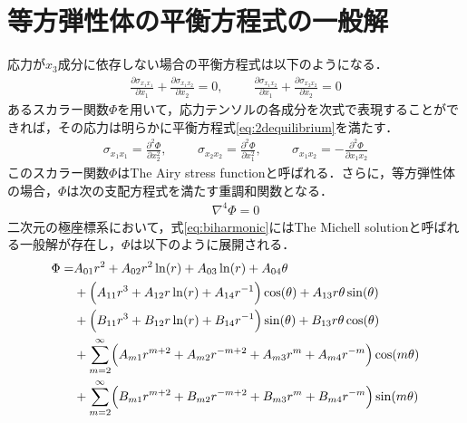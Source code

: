 \section{等方弾性体の平衡方程式の一般解}

応力が$x_{3}$成分に依存しない場合の平衡方程式は以下のようになる．
\begin{align}
	\frac{\partial \sigma_{x_{1}x_{1}}}{\partial x_{1}}+\frac{\partial \sigma_{x_{1}x_{2}}}{\partial x_{2}}=0,\hspace{1cm}
	\frac{\partial \sigma_{x_{1}x_{2}}}{\partial x_{1}}+\frac{\partial \sigma_{x_{2}x_{2}}}{\partial x_{2}}=0
	\label{eq:2dequilibrium}
\end{align}
あるスカラー関数$\Phi$を用いて，応力テンソルの各成分を次式で表現することができれば，その応力は明らかに平衡方程式\eqref{eq:2dequilibrium}を満たす．
\begin{align}
\sigma_{x_{1}x_{1}}=\frac{\partial^2 \Phi}{\partial x_{2}^2},\hspace{1cm}
\sigma_{x_{2}x_{2}}=\frac{\partial^2 \Phi}{\partial x_{1}^2},\hspace{1cm}
\sigma_{x_{1}x_{2}}=-\frac{\partial^2 \Phi}{\partial x_{1}x_{2}}
\label{eq:Airyxy}
\end{align}
このスカラー関数$\Phi$はThe Airy stress functionと呼ばれる．さらに，等方弾性体の場合，$\Phi$は次の支配方程式を満たす重調和関数となる．
\begin{align}
\nabla^4\Phi=0
\label{eq:biharmonic}
\end{align}
二次元の極座標系において，式\eqref{eq:biharmonic}にはThe Michell solutionと呼ばれる一般解が存在し，$\Phi$は以下のように展開される．
\begin{align}
\Phi =&A_{01}r^2+A_{02}r^2\ln(r)+A_{03}\ln(r)+A_{04}\theta
\nonumber
\\
&+\Bigl(A_{11}r^3+A_{12}r\ln(r)+A_{14}r^{-1}\Bigr)\cos(\theta)+A_{13}r\theta\sin(\theta)
\nonumber
\\
&+\Bigl(B_{11}r^3+B_{12}r\ln(r)+B_{14}r^{-1}\Bigr)\sin(\theta)+B_{13}r\theta\cos(\theta)
\nonumber
\\
&+\sum_{m=2}^{\infty}\Bigl(A_{m1}r^{m+2}+A_{m2}r^{-m+2}
+A_{m3}r^{m}+A_{m4}r^{-m}\Bigr)\cos(m\theta)
\nonumber
\\
&+\sum_{m=2}^{\infty}\Bigl(B_{m1}r^{m+2}+B_{m2}r^{-m+2}
+B_{m3}r^{m}+B_{m4}r^{-m}\Bigr)\sin(m\theta)
\label{eq:Michell}
\end{align}

